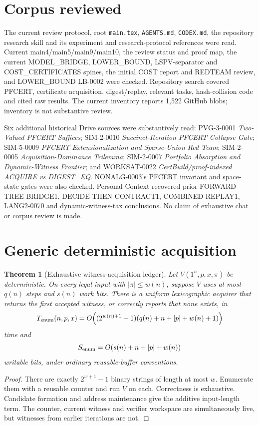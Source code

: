 \documentclass[11pt]{article}
\newtheorem{theorem}{Theorem}
\begin{document}
\section{Corpus reviewed}
The current review protocol, root \texttt{main.tex}, \texttt{AGENTS.md},
\texttt{CODEX.md}, the repository research skill and its experiment and
research-protocol references were read.  Current main4/main5/main9/main10,
the review status and proof map, the current MODEL\_BRIDGE, LOWER\_BOUND,
LSPV-separator and COST\_CERTIFICATES spines, the initial COST report and
REDTEAM review, and LOWER\_BOUND LB-0002 were checked.  Repository search
covered PFCERT, certificate acquisition, digest/replay, relevant tasks,
hash-collision code and cited raw results.  The current inventory reports
1,522 GitHub blobs; inventory is not substantive review.

Six additional historical Drive sources were substantively read:
PVG-3-0001 \emph{Two-Valued PFCERT Suffices}; SIM-2-0010
\emph{Succinct-Iteration PFCERT Collapse Gate}; SIM-5-0009
\emph{PFCERT Extensionalization and Sparse-Union Red Team}; SIM-2-0005
\emph{Acquisition-Dominance Trilemma}; SIM-2-0007
\emph{Portfolio Absorption and Dynamic-Witness Frontier}; and WORKSAT-0022
\emph{CertBuild/proof-indexed ACQUIRE vs DIGEST\_EQ}.  NONALG-0003's
PFCERT invariant and space-state gates were also checked.  Personal Context
recovered prior FORWARD-TREE-BRIDGE1, DECIDE-THEN-CONTRACT1,
COMBINED-REPLAY1, LANG2-0070 and dynamic-witness-tax conclusions.  No claim
of exhaustive chat or corpus review is made.

\section{Generic deterministic acquisition}
\begin{theorem}[Exhaustive witness-acquisition ledger]
Let $V(1^n,p,x,\pi)$ be deterministic.  On every legal input with
$|\pi|\le w(n)$, suppose $V$ uses at most $q(n)$ steps and $s(n)$ work
bits.  There is a uniform lexicographic acquirer that returns the first
accepted witness, or correctly reports that none exists, in
\[
 T_{\rm enum}(n,p,x)
 =O\!\left((2^{w(n)+1}-1)
       (q(n)+n+|p|+w(n)+1)\right)
\]
time and
\[
 S_{\rm enum}=O(s(n)+n+|p|+w(n))
\]
writable bits, under ordinary reusable-buffer conventions.
\end{theorem}
\begin{proof}
There are exactly $2^{w+1}-1$ binary strings of length at most $w$.
Enumerate them with a reusable counter and run $V$ on each.  Correctness is
exhaustive.  Candidate formation and address maintenance give the additive
input-length term.  The counter, current witness and verifier workspace are
simultaneously live, but witnesses from earlier iterations are not.
\end{proof}
\end{document}
